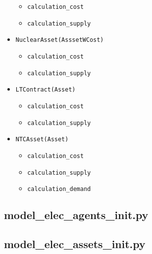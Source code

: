\begin{itemize}
	\begin{itemize}
	\item \texttt{calculation\_cost}
	\item \texttt{calculation\_supply}
	\end{itemize}
\item \texttt{NuclearAsset(AsssetWCost)}
	\begin{itemize}
	\item \texttt{calculation\_cost}
	\item \texttt{calculation\_supply}
	\end{itemize}
\item \texttt{LTContract(Asset)}
	\begin{itemize}
	\item \texttt{calculation\_cost}
	\item \texttt{calculation\_supply}
	\end{itemize}
\item \texttt{NTCAsset(Asset)}
	\begin{itemize}
	\item \texttt{calculation\_cost}
	\item \texttt{calculation\_supply}
	\item \texttt{calculation\_demand}
	\end{itemize}
\end{itemize}


\subsection{model\_elec\_agents\_init.py}



\subsection{model\_elec\_assets\_init.py}


